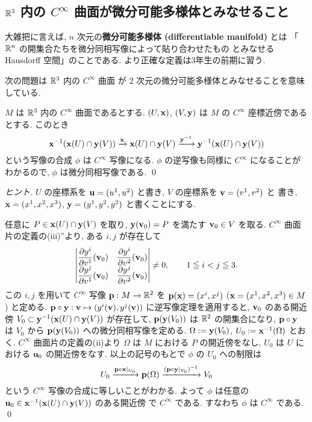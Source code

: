 \documentclass[12pt,twoside]{jarticle}
\begin{document}

\subsection{${\mathbb R}^3$ 内の $C^\infty$ 曲面が微分可能多様体とみなせること}

大雑把に言えば, 
$n$ 次元の{\bf 微分可能多様体 (differentiable manifold)} とは %
「${\mathbb R}^n$ の開集合たちを微分同相写像によって貼り合わせたもの
とみなせる Hausdorff 空間」のことである. 
より正確な定義は3年生の前期に習う.

次の問題は ${\mathbb R}^3$ 内の $C^\infty$ 曲面
が $2$ 次元の微分可能多様体とみなせることを意味している.

\begin{question}
 $M$ は ${\mathbb R}^3$ 内の $C^\infty$ 曲面であるとする. %
 $(U,{\mathbf x})$, $(V,{\mathbf y})$ は $M$ の $C^\infty$ 座標近傍であるとする. 
 このとき
 \begin{equation*}
   {\mathbf x}^{-1}({\mathbf x}(U)\cap{\mathbf y}(V))
   \xrightarrow{{\mathbf x}}
   {\mathbf x}(U)\cap{\mathbf y}(V)
   \xrightarrow{{\mathbf y}^{-1}}
   {\mathbf y}^{-1}({\mathbf x}(U)\cap{\mathbf y}(V))
 \end{equation*}
 という写像の合成 $\phi$ は $C^\infty$ 写像になる. 
 $\phi$ の逆写像も同様に $C^\infty$ になることがわかるので, 
 $\phi$ は微分同相写像である.
 \qed
\end{question}

\begin{proof}[ヒント]
 $U$ の座標系を ${\mathbf u}=(u^1,u^2)$ と書き, $V$ の座標系を ${\mathbf v}=(v^1,v^2)$ と
 書き, ${\mathbf x}=(x^1,x^2,x^3)$, ${\mathbf y}=(y^1,y^2,y^2)$ と書くことにする.

 任意に $P\in {\mathbf x}(U)\cap{\mathbf y}(V)$ を取り, 
 ${\mathbf y}({\mathbf v}_0)=P$ を満たす ${\mathbf v}_0\in V$ を取る.
 $C^\infty$ 曲面片の定義の(iii)''より, ある $i,j$ が存在して
 \begin{equation*}
 \begin{vmatrix}
  \dfrac{\partial y^i}{\partial v^1}({\mathbf v}_0) & \dfrac{\partial y^i}{\partial v^2}({\mathbf v}_0) \\
  \dfrac{\partial y^j}{\partial v^1}({\mathbf v}_0) & \dfrac{\partial y^j}{\partial v^2}({\mathbf v}_0) \\
 \end{vmatrix} \ne 0,
 \qquad
 1\leqq i<j\leqq 3.
 \end{equation*}
 この $i,j$ を用いて $C^\infty$ 写像 ${\mathbf p}:M\to{\mathbb R}^2$ 
 を ${\mathbf p}({\mathbf x})=(x^i,x^j)$ (${\mathbf x}=(x^1,x^2,x^3)\in M$) と定める.
 ${\mathbf p}\circ{\mathbf y}:{\mathbf v}\mapsto(y^i({\mathbf v}),y^j({\mathbf v}))$ に逆写像定理を適用すると, %
 ${\mathbf v}_0$ のある開近傍 $V_0\subset{\mathbf y}^{-1}({\mathbf x}(U)\cap{\mathbf y}(V))$ が存在して, %
 ${\mathbf p}({\mathbf y}(V_0))$ は ${\mathbb R}^2$ の開集合になり, 
 ${\mathbf p}\circ{\mathbf y}$ は $V_0$ から ${\mathbf p}({\mathbf y}(V_0))$ への微分同相写像を定める.
 $\Omega:={\mathbf y}(V_0)$, $U_0:={\mathbf x}^{-1}(\Omega)$ とおく.
 $C^\infty$ 曲面片の定義の(ii)より %
 $\Omega$ は $M$ における $P$ の開近傍をなし, 
 $U_0$ は $U$ における ${\mathbf u}_0$ の開近傍をなす.
 以上の記号のもとで $\phi$ の $U_0$ への制限は
 \begin{equation*}
  U_0
  \xrightarrow{{\mathbf p}\circ{\mathbf x}|_{U_0}}
  {\mathbf p}(\Omega)
  \xrightarrow{({\mathbf p}\circ{\mathbf y}|_{V_0})^{-1}}
  V_0
 \end{equation*}
 という $C^\infty$ 写像の合成に等しいことがわかる. 
 よって $\phi$ は任意の ${\mathbf u}_0\in{\mathbf x}^{-1}({\mathbf x}(U)\cap{\mathbf y}(V))$ のある開近傍
 で $C^\infty$ である. すなわち $\phi$ は $C^\infty$ である.
 \qed
\end{proof}
\end{document}
